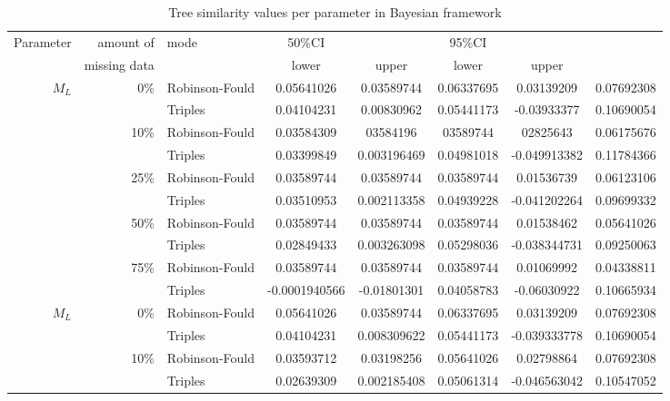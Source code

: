 \documentclass[12pt,letterpaper]{article}
\begin{document}
\begin{table}
\caption{Tree similarity values per parameter in Bayesian framework}
\centering
\begin{tabular}{rrlccccc}
    \hline
    Parameter & amount of    & mode & 50\%CI &       & 95\%CI & \\
              & missing data &      & lower  & upper & lower  & upper \\
    \hline
    $M_L$     & 0\%          & Robinson-Fould & 0.05641026 & 0.03589744  & 0.06337695 & 0.03139209  & 0.07692308 \\ %
              &              & Triples        & 0.04104231 & 0.00830962  & 0.05441173 & -0.03933377  & 0.10690054 \\
              & 10\%         & Robinson-Fould & 0.03584309 & 03584196  & 03589744 & 02825643  & 0.06175676 \\
              &              & Triples        & 0.03399849 & 0.003196469  & 0.04981018 & -0.049913382  & 0.11784366 \\
              & 25\%         & Robinson-Fould & 0.03589744 & 0.03589744  & 0.03589744 & 0.01536739  & 0.06123106 \\
              &              & Triples        & 0.03510953 & 0.002113358  & 0.04939228 & -0.041202264  & 0.09699332 \\
              & 50\%         & Robinson-Fould & 0.03589744 & 0.03589744  & 0.03589744 & 0.01538462  & 0.05641026 \\
              &              & Triples        & 0.02849433 & 0.003263098  & 0.05298036 & -0.038344731  & 0.09250063 \\
              & 75\%         & Robinson-Fould & 0.03589744 & 0.03589744  & 0.03589744 & 0.01069992  & 0.04338811 \\
              &              & Triples        & -0.0001940566 & -0.01801301  & 0.04058783 & -0.06030922  & 0.10665934 \\
    $M_L$     & 0\%          & Robinson-Fould & 0.05641026 & 0.03589744  & 0.06337695 & 0.03139209  & 0.07692308 \\
              &              & Triples        & 0.04104231 & 0.008309622  & 0.05441173 & -0.039333778  & 0.10690054 \\
              & 10\%         & Robinson-Fould & 0.03593712 & 0.03198256  & 0.05641026 & 0.02798864  & 0.07692308 \\
              &              & Triples        & 0.02639309 & 0.002185408  & 0.05061314 & -0.046563042  & 0.10547052 \\

\end{tabular}
\end{table}
\end{document}
